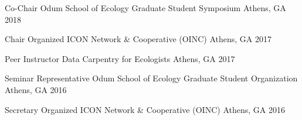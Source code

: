 

\begin{cvhonors}
\cvhonor
    {Co-Chair} %
    {Odum School of Ecology Graduate Student Symposium} %
    {Athens, GA} %
    {2018} %

\cvhonor
    {Chair} %
    {Organized ICON Network \& Cooperative (OINC)} %
    {Athens, GA} %
    {2017} %

\cvhonor
    {Peer Instructor} %
    {Data Carpentry for Ecologists} %
    {Athens, GA} %
    {2017} %

\cvhonor
    {Seminar Representative} %
    {Odum School of Ecology Graduate Student Organization} %
    {Athens, GA} %
    {2016} %

\cvhonor
    {Secretary} %
    {Organized ICON Network \& Cooperative (OINC)} %
    {Athens, GA} %
    {2016} %

\end{cvhonors}

